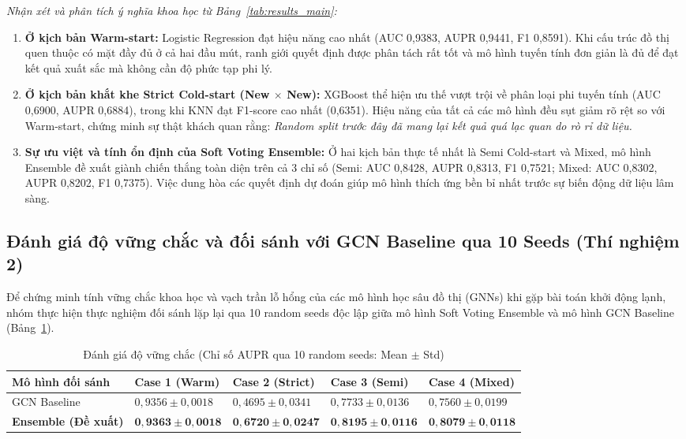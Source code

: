 \documentclass[12pt,a4paper,oneside]{report}
\begin{document}
\textit{Nhận xét và phân tích ý nghĩa khoa học từ Bảng~\ref{tab:results_main}:}
\begin{enumerate}
  \item \textbf{Ở kịch bản Warm-start:} Logistic Regression đạt hiệu năng cao nhất (AUC 0,9383, AUPR 0,9441, F1 0,8591). Khi cấu trúc đồ thị quen thuộc có mặt đầy đủ ở cả hai đầu mút, ranh giới quyết định được phân tách rất tốt và mô hình tuyến tính đơn giản là đủ để đạt kết quả xuất sắc mà không cần độ phức tạp phi lý.
  \item \textbf{Ở kịch bản khắt khe Strict Cold-start (New $\times$ New):} XGBoost thể hiện ưu thế vượt trội về phân loại phi tuyến tính (AUC 0,6900, AUPR 0,6884), trong khi KNN đạt F1-score cao nhất (0,6351). Hiệu năng của tất cả các mô hình đều sụt giảm rõ rệt so với Warm-start, chứng minh sự thật khách quan rằng: \textit{Random split trước đây đã mang lại kết quả quá lạc quan do rò rỉ dữ liệu.}
  \item \textbf{Sự ưu việt và tính ổn định của Soft Voting Ensemble:} Ở hai kịch bản thực tế nhất là Semi Cold-start và Mixed, mô hình Ensemble đề xuất giành chiến thắng toàn diện trên cả 3 chỉ số (Semi: AUC 0,8428, AUPR 0,8313, F1 0,7521; Mixed: AUC 0,8302, AUPR 0,8202, F1 0,7375). Việc dung hòa các quyết định dự đoán giúp mô hình thích ứng bền bỉ nhất trước sự biến động dữ liệu lâm sàng.
\end{enumerate}

\subsection{Đánh giá độ vững chắc và đối sánh với GCN Baseline qua 10 Seeds (Thí nghiệm 2)}
Để chứng minh tính vững chắc khoa học và vạch trần lỗ hổng của các mô hình học sâu đồ thị (GNNs) khi gặp bài toán khởi động lạnh, nhóm thực hiện thực nghiệm đối sánh lặp lại qua 10 random seeds độc lập giữa mô hình Soft Voting Ensemble và mô hình GCN Baseline (Bảng~\ref{tab:robustness}).

\begin{table}[H]
  \centering
  \caption{Đánh giá độ vững chắc (Chỉ số AUPR qua 10 random seeds: Mean $\pm$ Std)}
  \label{tab:robustness}
  \begin{tabularx}{\textwidth}{l >{\centering\arraybackslash}X >{\centering\arraybackslash}X >{\centering\arraybackslash}X >{\centering\arraybackslash}X}
    \toprule
    \textbf{Mô hình đối sánh} & \textbf{Case 1 (Warm)} & \textbf{Case 2 (Strict)} & \textbf{Case 3 (Semi)} & \textbf{Case 4 (Mixed)} \\
    \midrule
    GCN Baseline     & $0{,}9356 \pm 0{,}0018$ & $0{,}4695 \pm 0{,}0341$ & $0{,}7733 \pm 0{,}0136$ & $0{,}7560 \pm 0{,}0199$ \\
    \textbf{Ensemble (Đề xuất)} & $\mathbf{0{,}9363 \pm 0{,}0018}$ & $\mathbf{0{,}6720 \pm 0{,}0247}$ & $\mathbf{0{,}8195 \pm 0{,}0116}$ & $\mathbf{0{,}8079 \pm 0{,}0118}$ \\
    \bottomrule
  \end{tabularx}
\end{table}
\end{document}
